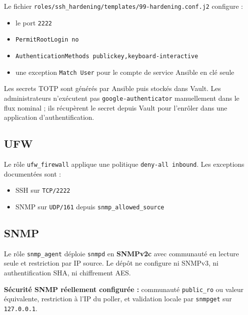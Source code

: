 \documentclass[11pt,a4paper]{article}
\newcommand{\iconLock}{\textcolor{AccentBlue}{\faLock}}
\begin{document}
Le fichier \texttt{roles/ssh\_hardening/templates/99-hardening.conf.j2} configure :

\begin{itemize}
  \item le port \texttt{2222}
  \item \texttt{PermitRootLogin no}
  \item \texttt{AuthenticationMethods publickey,keyboard-interactive}
  \item une exception \texttt{Match User} pour le compte de service Ansible en clé seule
\end{itemize}

Les secrets TOTP sont générés par Ansible puis stockés dans Vault. Les administrateurs n'exécutent pas \texttt{google-authenticator} manuellement dans le flux nominal ; ils récupèrent le secret depuis Vault pour l'enrôler dans une application d'authentification.

\subsection{UFW}

Le rôle \texttt{ufw\_firewall} applique une politique \texttt{deny-all inbound}. Les exceptions documentées sont :

\begin{itemize}
  \item SSH sur \texttt{TCP/2222}
  \item SNMP sur \texttt{UDP/161} depuis \texttt{snmp\_allowed\_source}
\end{itemize}

\subsection{SNMP}

Le rôle \texttt{snmp\_agent} déploie \texttt{snmpd} en \textbf{SNMPv2c} avec communauté en lecture seule et restriction par IP source. Le dépôt ne configure ni SNMPv3, ni authentification SHA, ni chiffrement AES.

\begin{tcolorbox}[
  enhanced,
  colback=PrimaryBlueLight,
  colframe=AccentBlue,
  boxrule=0pt,
  borderline west={3pt}{0pt}{AccentBlue},
  arc=0pt,
  left=10pt,right=10pt,top=7pt,bottom=7pt
]
\iconLock\hspace{0.4em}\textbf{Sécurité SNMP réellement configurée :} communauté \texttt{public\_ro} ou valeur équivalente, restriction à l'IP du poller, et validation locale par \texttt{snmpget} sur \texttt{127.0.0.1}.
\end{tcolorbox}
\end{document}
